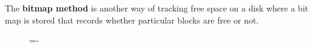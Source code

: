 \documentclass[a4paper]{systems-software}
\begin{document}
The \textbf{bitmap method} is another way of tracking free space on a disk where a bit map is stored that records whether particular blocks are free or not.

\begin{figure}[H]
  \lineskip=-\fboxrule
\end{figure}
\end{document}
